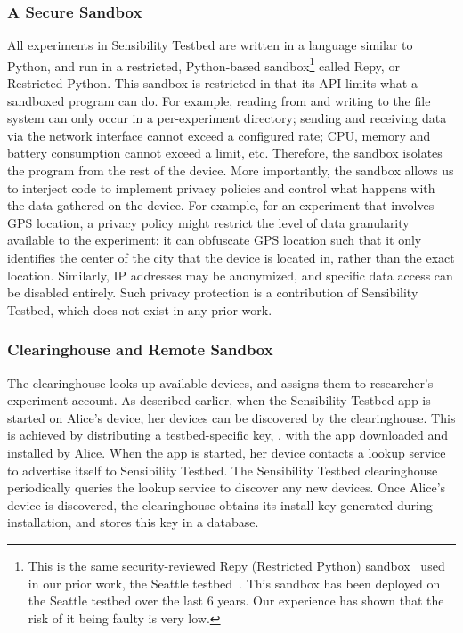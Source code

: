 \subsubsection{A Secure Sandbox}
All experiments in Sensibility Testbed are written in a language
similar to Python, and run in a restricted, Python-based
sandbox\footnote{This is the same security-reviewed Repy
(Restricted Python) sandbox~\cite{cappos2010retaining} used in
our prior work, the Seattle testbed~\cite{seattle}. This sandbox
has been deployed on the Seattle testbed over the last 6 years.
Our experience has shown that the risk of it being faulty is
very low.} called Repy, or Restricted Python. This sandbox is
restricted in that its API limits what a sandboxed program can
do. For example, reading from and writing to the file system can
only occur in a per-experiment directory; sending and receiving
data via the network interface cannot exceed a configured rate;
CPU, memory and battery consumption cannot exceed a limit, etc.
Therefore, the sandbox isolates the program from the rest of the
device. More importantly, the sandbox allows us to interject
code to implement privacy policies and control what happens with
the data gathered on the device. For example, for an experiment
that involves GPS location, a privacy policy might restrict the
level of data granularity available to the experiment: it can
obfuscate GPS location such that it only identifies the center
of the city that the device is located in, rather than the exact
location. Similarly, IP addresses may be anonymized, and
specific data access can be disabled entirely. Such privacy
protection is a contribution of Sensibility Testbed, which does
not exist in any prior work.

\subsubsection{Clearinghouse and Remote Sandbox}
The clearinghouse looks up available devices, and assigns them
to researcher's experiment account. As described earlier, when
the Sensibility Testbed app is started on Alice's device, her
devices can be discovered by the clearinghouse. This is achieved
by distributing a testbed-specific key, ,
with the app downloaded and installed by Alice. When the app is
started, her device contacts a lookup service to advertise
itself to Sensibility Testbed. The Sensibility Testbed
clearinghouse periodically queries the lookup service to
discover any new devices. Once Alice's device is discovered, the
clearinghouse obtains its install key  generated
during installation, and stores this key in a database.

